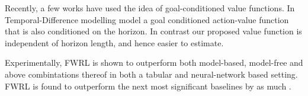 Recently, a few works have used the idea of goal-conditioned value functions. In
Temporal-Difference modelling \cite{pong2018temporal} model a goal conditioned
action-value function that is also conditioned on the horizon. In contrast our
proposed value function is independent of horizon length, and hence easier to
estimate.

Experimentally, FWRL is shown to outperform both model-based, model-free
and above combintations thereof in both a tabular and neural-network
based setting. FWRL is found to outperform the next most significant
baselines by as much .


